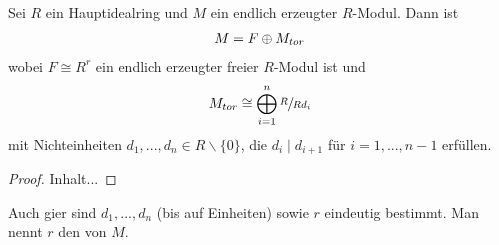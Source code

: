 \begin{theorem}
	Sei $R$ ein Hauptidealring und $M$ ein endlich erzeugter $R$-Modul. Dann ist
	\begin{align}
		M = F\oplus M_{tor}\notag
	\end{align}
	wobei $F\cong R^r$ ein endlich erzeugter freier $R$-Modul ist und
	\begin{align}
		M_{tor} \cong \bigoplus_{i=1}^n \sfrac{R}{Rd_i}\notag
	\end{align}
	mit Nichteinheiten $d_1,...,d_n\in R\backslash\{0\}$, die $d_i\mid d_{i+1}$ für $i=1,...,n-1$ erfüllen.
\end{theorem}
\begin{proof}
	Inhalt...
\end{proof}

\begin{remark}
	Auch gier sind $d_1,...,d_n$ (bis auf Einheiten) sowie $r$ eindeutig bestimmt. Man nennt $r$ den  von $M$.
\end{remark}